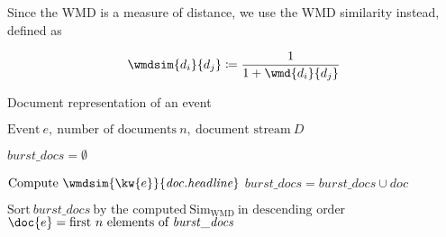 Since the WMD is a measure of distance, we use the WMD similarity instead, defined as

\begin{equation}
	\wmdsim{d_{i}}{d_{j}} \coloneqq \frac{1}{1 + \wmd{d_{i}}{d_{j}}}
\end{equation}

\begin{algorithm}[H]
\begin{algorithmic}[1]
\caption{Document representation of an event}
\Input $\text{Event}\ e,\ \text{number of documents}\ n,\ \text{document stream}\ D$

\State $\mathit{burst\_docs} = \emptyset$

		\State $\text{Compute}\ \wmdsim{\kw{e}}{\mathit{doc.headline}}$
		\State $\mathit{burst\_docs} = \mathit{burst\_docs} \cup \mathit{doc}$
	\EndIf
\EndFor

\State $\text{Sort}\ \mathit{burst\_docs}\ \text{by the computed}\ \text{Sim}_{\text{WMD}} \ \text{in descending order}$
\Output $\doc{e} = \text{first}\ n\ \text{elements of}\ \mathit{burst\_docs}$
\end{algorithmic}
\end{algorithm}